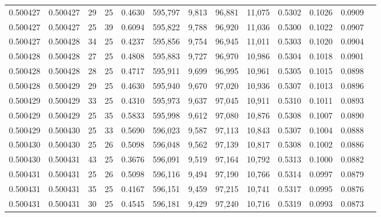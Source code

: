 \begin{tabular}{rrrrrrrrrrrrr}
0.500427 & 0.500427 &    29 &  25 &                                     0.4630 & 595,797 &   9,813 &  96,881 &  11,075 & 0.5302 & 0.1026 & 0.0909 \\
0.500427 & 0.500427 &    25 &  39 &                                     0.6094 & 595,822 &   9,788 &  96,920 &  11,036 & 0.5300 & 0.1022 & 0.0907 \\
0.500427 & 0.500428 &    34 &  25 &                                     0.4237 & 595,856 &   9,754 &  96,945 &  11,011 & 0.5303 & 0.1020 & 0.0904 \\
0.500428 & 0.500428 &    27 &  25 &                                     0.4808 & 595,883 &   9,727 &  96,970 &  10,986 & 0.5304 & 0.1018 & 0.0901 \\
0.500428 & 0.500428 &    28 &  25 &                                     0.4717 & 595,911 &   9,699 &  96,995 &  10,961 & 0.5305 & 0.1015 & 0.0898 \\
0.500428 & 0.500429 &    29 &  25 &                                     0.4630 & 595,940 &   9,670 &  97,020 &  10,936 & 0.5307 & 0.1013 & 0.0896 \\
0.500429 & 0.500429 &    33 &  25 &                                     0.4310 & 595,973 &   9,637 &  97,045 &  10,911 & 0.5310 & 0.1011 & 0.0893 \\
0.500429 & 0.500429 &    25 &  35 &                                     0.5833 & 595,998 &   9,612 &  97,080 &  10,876 & 0.5308 & 0.1007 & 0.0890 \\
0.500429 & 0.500430 &    25 &  33 &                                     0.5690 & 596,023 &   9,587 &  97,113 &  10,843 & 0.5307 & 0.1004 & 0.0888 \\
0.500430 & 0.500430 &    25 &  26 &                                     0.5098 & 596,048 &   9,562 &  97,139 &  10,817 & 0.5308 & 0.1002 & 0.0886 \\
0.500430 & 0.500431 &    43 &  25 &                                     0.3676 & 596,091 &   9,519 &  97,164 &  10,792 & 0.5313 & 0.1000 & 0.0882 \\
0.500431 & 0.500431 &    25 &  26 &                                     0.5098 & 596,116 &   9,494 &  97,190 &  10,766 & 0.5314 & 0.0997 & 0.0879 \\
0.500431 & 0.500431 &    35 &  25 &                                     0.4167 & 596,151 &   9,459 &  97,215 &  10,741 & 0.5317 & 0.0995 & 0.0876 \\
0.500431 & 0.500431 &    30 &  25 &                                     0.4545 & 596,181 &   9,429 &  97,240 &  10,716 & 0.5319 & 0.0993 & 0.0873 \\

\end{tabular}
